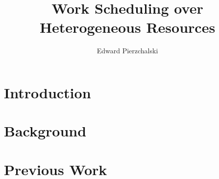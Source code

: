 \documentclass[a4paper,12pt]{article}
\title{Work Scheduling over Heterogeneous Resources}
\author{Edward Pierzchalski}
\begin{document}
\maketitle

\begin{abstract}

\end{abstract}

\pagebreak

\begin{multicols}{2}

\section{Introduction}

\section{Background}

\section{Previous Work}

\end{multicols}
\end{document}
